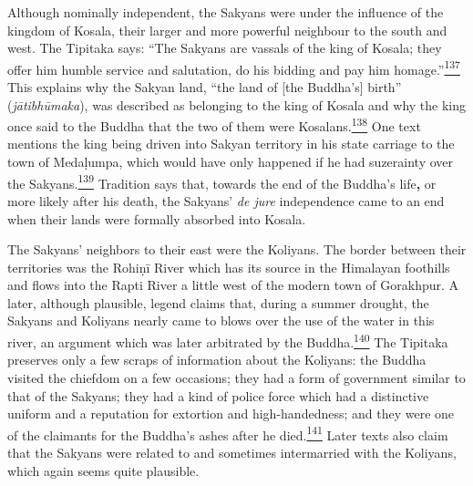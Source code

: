 Although nominally independent, the Sakyans were under the influence of
the kingdom of Kosala, their larger and more powerful neighbour to the
south and west. The Tipitaka says: ``The Sakyans are vassals of the king
of Kosala; they offer him humble service and salutation, do his bidding
and pay him
homage.''\label{footprints_split_008.html_fnref137}\hyperref[footprints_split_024.htmlux5cux23fn137]{\textsuperscript{137}}
This explains why the Sakyan land, ``the land of {[}the Buddha's{]}
birth'' (\emph{jātibhūmaka}), was described as belonging to the king of
Kosala and why the king once said to the Buddha that the two of them
were
Kosalans.\label{footprints_split_008.html_fnref138}\hyperref[footprints_split_024.htmlux5cux23fn138]{\textsuperscript{138}}
One text mentions the king being driven into Sakyan territory in his
state carriage to the town of Medaḷumpa, which would have only happened
if he had suzerainty over the
Sakyans.\label{footprints_split_008.html_fnref139}\hyperref[footprints_split_024.htmlux5cux23fn139]{\textsuperscript{139}}
Tradition says that, towards the end of the Buddha's life\textbf{,} or
more likely after his death, the Sakyans' \emph{de jure} independence
came to an end when their lands were formally absorbed into Kosala.

The Sakyans' neighbors to their east were the Koliyans. The border
between their territories was the Rohiṇī River which has its source in
the Himalayan foothills and flows into the Rapti River a little west of
the modern town of Gorakhpur. A later, although plausible, legend claims
that, during a summer drought, the Sakyans and Koliyans nearly came to
blows over the use of the water in this river, an argument which was
later arbitrated by the
Buddha.\label{footprints_split_008.html_fnref140}\hyperref[footprints_split_024.htmlux5cux23fn140]{\textsuperscript{140}}
The Tipitaka preserves only a few scraps of information about the
Koliyans: the Buddha visited the chiefdom on a few occasions; they had a
form of government similar to that of the Sakyans; they had a kind of
police force which had a distinctive uniform and a reputation for
extortion and high-handedness; and they were one of the claimants for
the Buddha's ashes after he
died.\label{footprints_split_008.html_fnref141}\hyperref[footprints_split_024.htmlux5cux23fn141]{\textsuperscript{141}}
Later texts also claim that the Sakyans were related to and sometimes
intermarried with the Koliyans, which again seems quite plausible.

